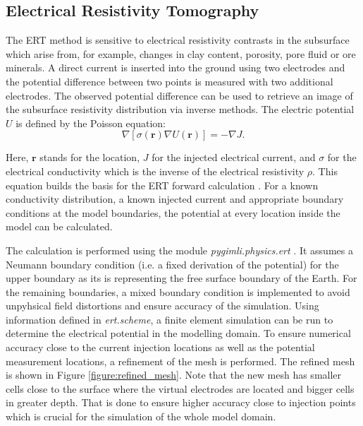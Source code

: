 \subsection{Electrical Resistivity Tomography}\label{section:ERT}
The ERT method is sensitive to electrical resistivity contrasts in the subsurface which arise from, for example, changes in clay content, porosity, pore fluid or ore minerals. A direct current is inserted into the ground using two electrodes and the potential difference between two points is measured with two additional electrodes. The observed potential difference can be used to retrieve an image of the subsurface resistivity distribution via inverse methods. The electric potential $U$ is defined by the Poisson equation: 
\begin{equation}
    \nabla[\sigma (\textbf{r}) \nabla U(\textbf{r})] = -\nabla J .
    \label{Eq:poisson}
\end{equation}

Here, $\textbf{r}$ stands for the location, $J$ for the injected electrical current, and $\sigma$ for the electrical conductivity which is the inverse of the electrical resistivity $\rho$. This equation builds the basis for the ERT forward calculation \citep{johnson2015accurate}. For a known conductivity distribution, a known injected current and appropriate boundary conditions at the model boundaries, the potential at every location inside the model can be calculated. 

The calculation is performed using the module \textit{pygimli.physics.ert} \citep{gunther20063, rucker20063}. It assumes a Neumann boundary condition (i.e. a fixed derivation of the potential) for the upper boundary as its is representing the free surface boundary of the Earth. For the remaining boundaries, a mixed boundary condition is implemented to avoid unpyhsical field distortions and ensure accuracy of the simulation. Using information defined in \textit{ert.scheme}, a finite element simulation can be run to determine the electrical potential in the modelling domain. To ensure numerical accuracy close to the current injection locations as well as the potential measurement locations, a refinement of the mesh is performed. The refined mesh is shown in Figure \ref{figure:refined_mesh}. Note that the new mesh has smaller cells close to the surface where the virtual electrodes are located and bigger cells in greater depth. That is done to ensure higher accuracy close to injection points which is crucial for the simulation of the whole model domain.

